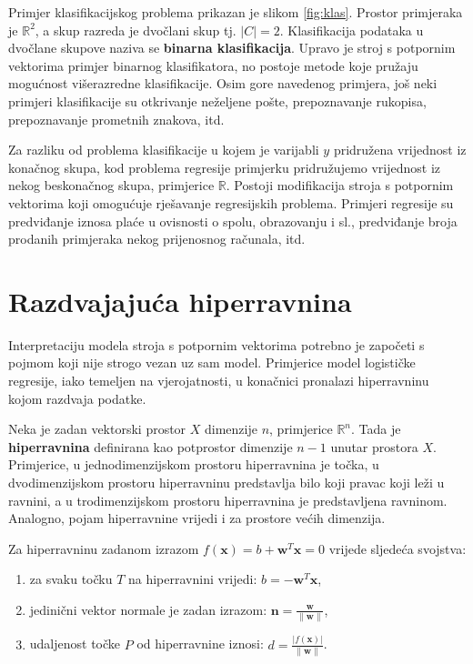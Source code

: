 \documentclass[times, utf8, zavrsni, numeric]{fer}
\begin{document}
\par Primjer klasifikacijskog problema prikazan je slikom \ref{fig:klas}. 
Prostor primjeraka je $\mathbb{R}^2$, a skup razreda je dvočlani skup tj. $\left\vert{C}\right\vert=2$.
Klasifikacija podataka u dvočlane skupove naziva se \textbf{binarna klasifikacija}.
Upravo je stroj s potpornim vektorima primjer binarnog klasifikatora, no postoje metode koje pružaju mogućnost
višerazredne klasifikacije.
Osim gore navedenog primjera, još neki primjeri klasifikacije su otkrivanje neželjene pošte, prepoznavanje rukopisa,
prepoznavanje prometnih znakova, itd.

\par Za razliku od problema klasifikacije u kojem je varijabli $y$ pridružena vrijednost iz konačnog skupa, 
kod problema regresije primjerku pridružujemo vrijednost iz nekog beskonačnog skupa, primjerice $\mathbb{R}$.
Postoji modifikacija stroja s potpornim vektorima koji omogućuje rješavanje regresijskih problema.
Primjeri regresije su predviđanje iznosa plaće u ovisnosti o spolu, obrazovanju i sl., predviđanje broja prodanih 
primjeraka nekog prijenosnog računala, itd.

\section{Razdvajajuća hiperravnina} \label{hmargine}
Interpretaciju modela stroja s potpornim vektorima potrebno je započeti s pojmom koji nije strogo vezan uz sam model.
Primjerice model logističke regresije, iako temeljen na vjerojatnosti, u konačnici pronalazi hiperravninu kojom razdvaja
podatke.

\par Neka je zadan vektorski prostor $\textit{X}$ dimenzije $n$, primjerice $\mathbb{R}^n$.
Tada je \textbf{hiperravnina} definirana kao potprostor dimenzije $n-1$ unutar prostora $\textit{X}$.
Primjerice, u jednodimenzijskom prostoru hiperravnina je točka, u dvodimenzijskom prostoru
 hiperravninu predstavlja bilo koji pravac koji leži u ravnini, a u trodimenzijskom prostoru hiperravnina
 je predstavljena ravninom. 
Analogno, pojam hiperravnine vrijedi i za prostore većih dimenzija. 

\par Za hiperravninu zadanom izrazom $f(\mathbf{x})=b + \mathbf{w}^T\mathbf{x} = 0$ 
vrijede sljedeća svojstva:
\begin{enumerate}
  \item za svaku točku $T$ na hiperravnini vrijedi: $b = -\mathbf{w}^T\mathbf{x}$,
  \item jedinični vektor normale je zadan izrazom: $\mathbf{n} = \frac{\mathbf{w}}{\|\mathbf{w}\|}$,
  \item udaljenost točke $P$ od hiperravnine iznosi: $d = \frac{|f(\mathbf{x})|}{\|\mathbf{w}\|}$.
\end{enumerate}
\end{document}
